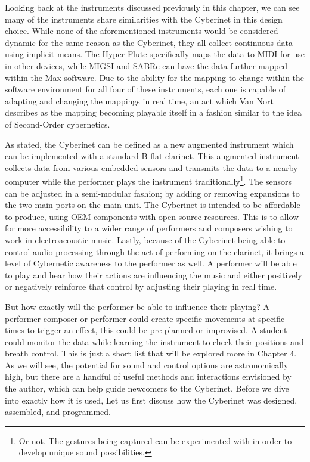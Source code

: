 Looking back at the instruments discussed previously in this chapter, we can see many of the instruments share similarities with the Cyberinet in this design choice. While none of the aforementioned instruments would be considered dynamic for the same reason as the Cyberinet, they all collect continuous data using implicit means. The Hyper-Flute specifically maps the data to MIDI for use in other devices, while MIGSI and SABRe can have the data further mapped within the Max software. Due to the ability for the mapping to change within the software environment for all four of these instruments, each one is capable of adapting and changing the mappings in real time, an act which Van Nort describes as the mapping becoming playable itself\cite{vanNortMapping2007} in a fashion similar to the idea of Second-Order cybernetics.


As stated, the Cyberinet can be defined as a new augmented instrument which can be implemented with a standard B-flat clarinet. This augmented instrument collects data from various embedded sensors and transmits the data to a nearby computer while the performer plays the instrument traditionally\footnote{Or not. The gestures being captured can be experimented with in order to develop unique sound possibilities.}. The sensors can be adjusted in a semi-modular fashion; by adding or removing expansions to the two main ports on the main unit. The Cyberinet is intended to be affordable to produce, using OEM components with open-source resources. This is to allow for more accessibility to a wider range of performers and composers wishing to work in electroacoustic music. Lastly, because of the Cyberinet being able to control audio processing through the act of performing on the clarinet, it brings a level of Cybernetic awareness to the performer as well. A performer will be able to play and hear how their actions are influencing the music and either positively or negatively reinforce that control by adjusting their playing in real time. 

But how exactly will the performer be able to influence their playing? A performer composer or performer could create specific movements at specific times to trigger an effect, this could be pre-planned or improvised. A student could monitor the data while learning the instrument to check their positions and breath control. This is just a short list that will be explored more in Chapter 4. As we will see, the potential for sound and control options are astronomically high, but there are a handful of useful methods and interactions envisioned by the author, which can help guide newcomers to the Cyberinet. Before we dive into exactly how it is used, Let us first discuss how the Cyberinet was designed, assembled, and programmed.


